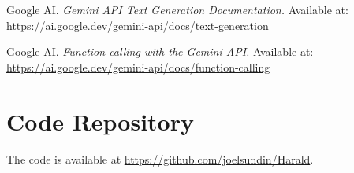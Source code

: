 \documentclass[a4paper,10pt]{article}
\begin{document}
\hfill \break


\begin{thebibliography}{1}

Google AI. \textit{Gemini API Text Generation Documentation.} 
Available at: \url{https://ai.google.dev/gemini-api/docs/text-generation}

Google AI. \textit{Function calling with the Gemini API.} Available at: \url{https://ai.google.dev/gemini-api/docs/function-calling}

\end{thebibliography}


	
	
\pagebreak
\appendix
\section{Code Repository}
The code is available at \url{https://github.com/joelsundin/Harald}.
	
%	
%	
\end{document}
